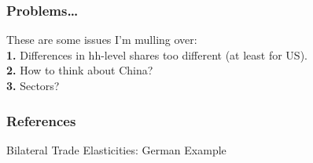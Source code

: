 \documentclass[9pt,pdftex,aspectratio=1610]{beamer}
\theoremstyle{definition}
\begin{document}

\begin{frame}[t]
\frametitle{Problems\ldots}
\smallskip
These are some issues I'm mulling over:\\
\bigskip
\textbf{1.} Differences in hh-level shares too different (at least for US).\\
\bigskip
\textbf{2.} How to think about China?\\
\bigskip
\textbf{3.} Sectors?\\
\end{frame}




\appendix

\setcounter{finalframe}{\value{framenumber}}

\begin{frame}[allowframebreaks]
\frametitle{References}
\scriptsize

\end{frame}




\begin{frame}[t]{Bilateral Trade Elasticities: German Example}
\begin{figure}[!t]
\end{figure}
\end{frame}





\setcounter{framenumber}{\value{finalframe}}

\end{document}
